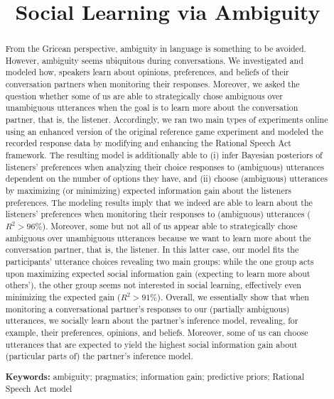 \documentclass[10pt,a4paper]{article}
\title{Social Learning via Ambiguity}
\begin{document}
\maketitle

\begin{abstract}
From the Gricean perspective, ambiguity in language is something to be avoided. 
However, ambiguity seems ubiquitous during conversations. 
We investigated and modeled how, speakers learn about opinions, preferences, and beliefs of their conversation partners when monitoring their responses.
Moreover, we asked the question whether some of us are able to strategically chose ambiguous over unambiguous utterances when the goal is to learn more about the conversation partner, that is, the listener.
Accordingly, we ran two main types of experiments online using an enhanced version of the original reference game experiment \cite{frankgoodman2012} and modeled the recorded response data by modifying and enhancing the Rational Speech Act framework.
The resulting model is additionally able to 
(i) infer Bayesian posteriors of listeners' preferences when analyzing their choice responses to (ambiguous) utterances dependent on the number of options they have, and 
(ii) choose (ambiguous) utterances by maximizing (or minimizing) expected information gain about the listeners preferences. 
The modeling results imply that we indeed are able to learn about the listeners' preferences when monitoring their responses to (ambiguous) utterances ($R^2>96\%$).
Moreover, some but not all of us appear able to strategically chose ambiguous over unambiguous utterances because we want to learn more about the conversation partner, that is, the listener.
In this latter case, our model fits the participants' utterance choices revealing two main groups: while the one group acts upon maximizing expected social information gain (expecting to learn more about others'), the other group seems not interested in social learning, effectively even minimizing the expected gain ($R^2>91\%$). 
Overall, we essentially show that when monitoring a conversational partner's responses to our (partially ambiguous) utterances, we socially learn about the partner's inference model, revealing, for example, their preferences, opinions, and beliefs. 
Moreover, some of us can choose utterances that are expected to yield the highest social information gain about (particular parts of) the partner's inference model.

\textbf{Keywords:} 
ambiguity; pragmatics; information gain; predictive priors; Rational Speech Act model
\end{abstract}
\end{document}
